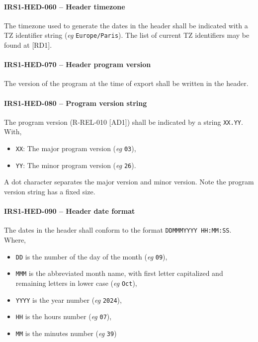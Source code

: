 \paragraph{IRS1-HED-060 -- Header timezone}
The timezone used to generate the dates in the header shall be indicated
with a TZ identifier string (\textit{eg} \lstinline{Europe/Paris}).
The list of current TZ identifiers may be found at [RD1].

\paragraph{IRS1-HED-070 -- Header program version}
The version of the program at the time of export shall be written
in the header.

\paragraph{IRS1-HED-080 -- Program version string}
The program version (R-REL-010 [AD1]) shall be indicated by a string
\lstinline{XX.YY}. With,
\begin{itemize}
\item \lstinline{XX}: The major program version (\textit{eg} \lstinline{03}),
\item \lstinline{YY}: The minor program version (\textit{eg} \lstinline{26}).
\end{itemize}

A dot character separates the major version and minor version.
Note the program version string has a fixed size.

\paragraph{IRS1-HED-090 -- Header date format}
The dates in the header shall conform to the format
\lstinline{DDMMMYYYY HH:MM:SS}.
Where,
\begin{itemize}
\item \lstinline{DD} is the number of the day of the month
  (\textit{eg} \lstinline{09}),
\item \lstinline{MMM} is the abbreviated month name, with first letter
  capitalized and remaining letters in lower case (\textit{eg} \lstinline{Oct}),
\item \lstinline{YYYY} is the year number (\textit{eg} \lstinline{2024}),
\item \lstinline{HH} is the hours number (\textit{eg} \lstinline{07}),
\item \lstinline{MM} is the minutes number (\textit{eg} \lstinline{39})
\end{itemize}

